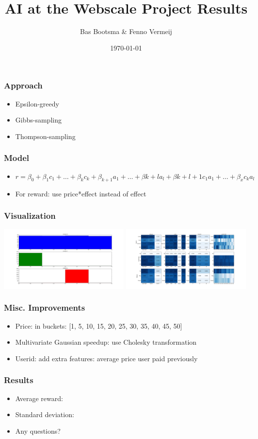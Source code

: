 \documentclass{beamer}
\title[AI@Webscale Presentation]{
  AI at the Webscale Project Results}
\author[Bas Bootsma, Fenno Vermeij]{Bas Bootsma \& Fenno Vermeij}
\institute[Radboud University Nijmegen]{Radboud University Nijmegen}
\date{\today}
\begin{document}
\begin{frame}
  \titlepage
\end{frame}

\begin{frame}
	\frametitle{Approach}	
	\begin{itemize}
		\item Epsilon-greedy
		\item Gibbs-sampling
		\item Thompson-sampling
	\end{itemize}
\end{frame}

\begin{frame}
	\frametitle{Model}
	\begin{itemize}
		\item $r = \beta_0 + \beta_1 c_1 + \ldots + \beta_k c_k + \beta_{k+1} a_1 + \ldots + \beta {k+l} a_l + \beta {k+l+1} c_1a_1 + \ldots + \beta_{x} c_ka_l$
		\item For reward: use price*effect instead of effect
	\end{itemize}
\end{frame}

\begin{frame}
	\frametitle{Visualization}
	\includegraphics[width=0.49\textwidth]{test.png}
	\includegraphics[width=0.49\textwidth]{viewer.png}
\end{frame}


\begin{frame}
	\frametitle{Misc. Improvements}
	\begin{itemize}
		\item Price: in buckets: [1, 5, 10, 15, 20, 25, 30, 35, 40, 45, 50]
		\item Multivariate Gaussian speedup: use Cholesky transformation
		\item Userid: add extra features: average price user paid previously
	\end{itemize}
\end{frame}


\begin{frame}
  \frametitle{Results}

  \begin{itemize}
    \item Average reward: 
    \item Standard deviation: 
    \item Any questions?
  \end{itemize}
\end{frame}
\end{document}
